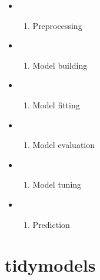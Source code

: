 \documentclass[
]{book}
\providecommand{\tightlist}{%
  \setlength{\itemsep}{0pt}\setlength{\parskip}{0pt}}
\begin{document}
\begin{itemize}
\item
  \begin{enumerate}
  \def\labelenumi{\arabic{enumi}.}
  \tightlist
  \item
    Preprocessing
  \end{enumerate}
\item
  \begin{enumerate}
  \def\labelenumi{\arabic{enumi}.}
  \setcounter{enumi}{1}
  \tightlist
  \item
    Model building
  \end{enumerate}
\item
  \begin{enumerate}
  \def\labelenumi{\arabic{enumi}.}
  \setcounter{enumi}{2}
  \tightlist
  \item
    Model fitting
  \end{enumerate}
\item
  \begin{enumerate}
  \def\labelenumi{\arabic{enumi}.}
  \setcounter{enumi}{3}
  \tightlist
  \item
    Model evaluation
  \end{enumerate}
\item
  \begin{enumerate}
  \def\labelenumi{\arabic{enumi}.}
  \setcounter{enumi}{4}
  \tightlist
  \item
    Model tuning
  \end{enumerate}
\item
  \begin{enumerate}
  \def\labelenumi{\arabic{enumi}.}
  \setcounter{enumi}{5}
  \tightlist
  \item
    Prediction
  \end{enumerate}
\end{itemize}

\hypertarget{tidymodels}{%
\section{tidymodels}\label{tidymodels}}
\end{document}
